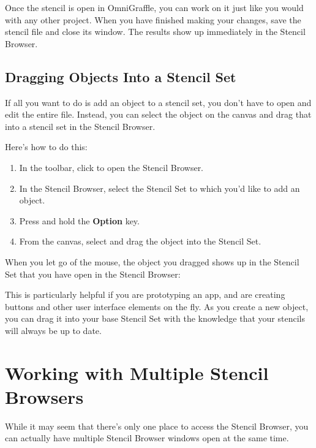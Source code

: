 \documentclass[../main.tex]{subfiles}
\begin{document}
Once the stencil is open in OmniGraffle, you can work on it just like you would with any other
project. When you have finished making your changes, save the stencil file and close its
window. The results show up immediately in the Stencil Browser.

\subsection{Dragging Objects Into a Stencil Set}

If all you want to do is add an object to a stencil set, you don't have to open and edit the
entire file. Instead, you can select the object on the canvas and drag that into a stencil set
in the Stencil Browser.

Here's how to do this:

\begin{enumerate}
  \item In the toolbar, click  to open the
    Stencil Browser.
  \item In the Stencil Browser, select the Stencil Set to which you'd like to add an object.
  \item Press and hold the \textbf{Option} key.
  \item From the canvas, select and drag the object into the Stencil Set.

\end{enumerate}

When you let go of the mouse, the object you dragged shows up in the Stencil Set that you have
open in the Stencil Browser:


This is particularly helpful if you are prototyping an app, and are creating buttons and other
user interface elements on the fly. As you create a new object, you can drag it into your base
Stencil Set with the knowledge that your stencils will always be up to date.

\section{Working with Multiple Stencil Browsers}

While it may seem that there's only one place to access the Stencil Browser, you can actually
have multiple Stencil Browser windows open at the same time.
\end{document}
